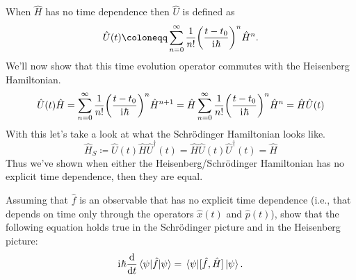 \documentclass[boxes,pages]{homework}
\makeatletter
\newcommand{\iu}{\mathrm{i}\mkern1mu}
\newcommand{\herm}[1]{{{#1}^\dagger}}
\numberwithin{@problem}{section}
\makeatother
\begin{document}
\begin{solution}
	When $\hat{H}$ has no time dependence then $\hat{U}$ is defined as
	\begin{equation*}
		\hat{U}(t)\coloneqq \sum_{n = 0}^\infty\frac{1}{n!}\qty(\frac{t - t_0}{\iu\hbar})^n\hat{H}^n.
	\end{equation*}
	We'll now show that this time evolution operator commutes with the Heisenberg Hamiltonian.
	\begin{equation*}
		\hat{U}(t)\hat{H} = \sum_{n = 0}^\infty\frac{1}{n!}\qty(\frac{t - t_0}{\iu\hbar})^n\hat{H}^{n + 1} = \hat{H}\sum_{n = 0}^\infty\frac{1}{n!}\qty(\frac{t - t_0}{\iu\hbar})^n\hat{H}^n = \hat{H}\hat{U}(t)
	\end{equation*}
	With this let's take a look at what the Schr\"odinger Hamiltonian looks like.
	\begin{equation*}
		\hat{H}_S \coloneqq \hat{U}(t)\hat{H}\herm{\hat{U}}(t) = \hat{H}\hat{U}(t)\herm{\hat{U}}(t) = \hat{H}
	\end{equation*}
	Thus we've shown when either the Heisenberg/Schr\"odinger Hamiltonian has no explicit time dependence, then they are equal.
\end{solution}

\begin{problem}
Assuming that $\hat{f}$ is an observable that has no explicit time dependence (i.e., that depends on time only through the operators $\hat{x}(t)$ and $\hat{p}(t)$), show that the following equation holds true in the Schr\"{o}dinger picture and in the Heisenberg picture:
\begin{equation*}
	\iu\hbar\dv{t}\expval{\hat{f}}{\psi} = \expval{\comm*{\hat{f}}{\hat{H}}}{\psi}.
\end{equation*}
\end{problem}
\end{document}
